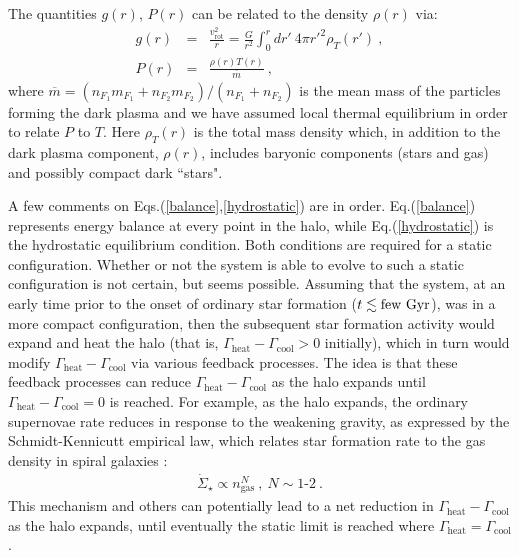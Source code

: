 \documentclass[12pt]{article}
\begin{document}
{{The quantities $g(r)$, $P(r)$ can be related to the density $\rho (r)$ via:
%
\begin{eqnarray}
g(r) &=& \frac{v _{\text{rot}} ^2}{r} = \frac{G}{r ^2} \int _0 ^r dr' \ 4\pi {r'} ^2 \rho _T (r') \ , \nonumber \\
P(r) &=& \frac{\rho(r)T(r)}{\overline{m}} \ ,
\label{grhop}
\end{eqnarray}
%
where $\overline{m} = (n _{F_1}m _{F_1} + n _{F_2}m _{F_2})/(n _{F_1} + n _{F_2})$ is the mean mass of the particles forming the dark plasma and we have assumed local thermal equilibrium in order to relate $P$ to $T$. Here $\rho _T (r)$ is the total mass density which, in addition to the dark plasma component, $\rho (r)$, includes baryonic components (stars and gas) and possibly compact dark ``stars".

A few comments on Eqs.(\ref{balance},\ref{hydrostatic}) are in order. Eq.(\ref{balance}) represents energy balance at every point in the halo, while Eq.(\ref{hydrostatic}) is the hydrostatic equilibrium condition. Both conditions are required for a static configuration. Whether or not the system is able to evolve to such a static configuration is not certain, but seems possible. Assuming that the system, at an early time prior to the onset of ordinary star formation ($t \lesssim {\rm few} \ {\rm Gyr}$), was in a more compact configuration, then the subsequent star formation activity would expand and heat the halo (that is, $\Gamma _{\text{heat}} - \Gamma _{\text{cool}} > 0$ initially), which in turn would modify $\Gamma _{\text{heat}}-\Gamma _{\text{cool}}$ via various feedback processes. The idea is that these feedback processes can reduce $\Gamma _{\text{heat}} - \Gamma _{\text{cool}}$ as the halo expands until $\Gamma _{\text{heat}} - \Gamma _{\text{cool}} = 0$ is reached. For example, as the halo expands, the ordinary supernovae rate reduces in response to the weakening gravity, as expressed by the Schmidt-Kennicutt empirical law, which relates star formation rate to the gas density in spiral galaxies \cite{schmidt}:
%
\begin{eqnarray}
\dot{\Sigma} _{\star} \propto n _{\text{gas}} ^N \ , \ N \sim 1\text{-}2 \ .
\end{eqnarray}
%
This mechanism and others can potentially lead to a net reduction in $\Gamma _{\text{heat}} - \Gamma _{\text{cool}}$ as the halo expands, until eventually the static limit is reached where $\Gamma_{\text{heat}} = \Gamma_{\text{cool}}$.

}}
\end{document}
